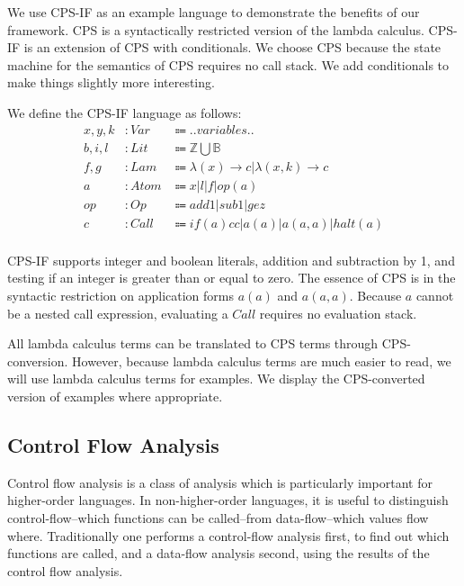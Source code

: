\documentclass{article}
\begin{document}
We use CPS-IF as an example language to demonstrate the benefits of our framework.
CPS is a syntactically restricted version of the lambda calculus.
CPS-IF is an extension of CPS with conditionals.
We choose CPS because the state machine for the semantics of CPS requires no call stack.
We add conditionals to make things slightly more interesting.

We define the CPS-IF language as follows:
\begin{align*}
x,y,k &: Var  &⩴ ..variables..                          \\
b,i,l &: Lit  &⩴ ℤ ⋃ 𝔹                                  \\
f,g   &: Lam  &⩴ λ(x) → c | λ(x,k) → c                  \\
a     &: Atom &⩴ x | l | f | op(a)                      \\
op    &: Op   &⩴ add1 | sub1 | gez                      \\
c     &: Call &⩴ if(a){c}{c} | a(a) | a(a,a) | halt(a)  \\
\end{align*}

CPS-IF supports integer and boolean literals, addition and subtraction by 1, and testing if an integer is greater than or equal to zero.
The essence of CPS is in the syntactic restriction on application forms $a(a)$ and $a(a,a)$.  
Because $a$ cannot be a nested call expression, evaluating a $Call$ requires no evaluation stack.

All lambda calculus terms can be translated to CPS terms through CPS-conversion.
However, because lambda calculus terms are much easier to read, we will use lambda calculus terms for examples.
We display the CPS-converted version of examples where appropriate.


\subsection{Control Flow Analysis}
\label{section:Background:ControlFlowAnalysis}

Control flow analysis is a class of analysis which is particularly important for higher-order languages.
In non-higher-order languages, it is useful to distinguish control-flow--which functions can be called--from data-flow--which values flow where.
Traditionally one performs a control-flow analysis first, to find out which functions are called, and a data-flow analysis second, using the results of the control flow analysis.
\end{document}
